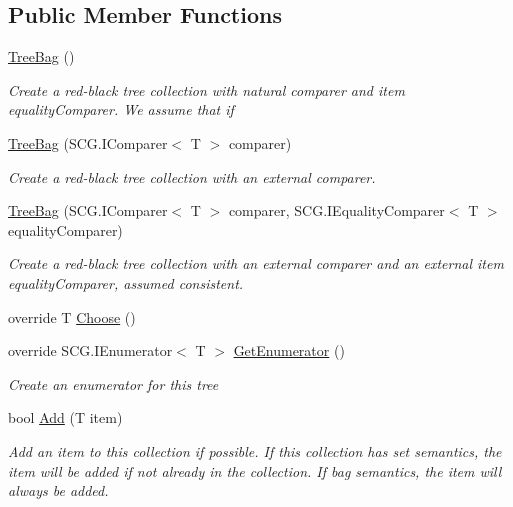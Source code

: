 \subsection*{Public Member Functions}
\begin{DoxyCompactItemize}
\item 
\hyperlink{class_c5_1_1_tree_bag_a5bde6ec5c04b5bdc82306b2fd8b436fd}{Tree\+Bag} ()
\begin{DoxyCompactList}\small\item\em Create a red-\/black tree collection with natural comparer and item equality\+Comparer. We assume that if \end{DoxyCompactList}\item 
\hyperlink{class_c5_1_1_tree_bag_aea3bce59511bfa8245f7662008cf43ac}{Tree\+Bag} (S\+C\+G.\+I\+Comparer$<$ T $>$ comparer)
\begin{DoxyCompactList}\small\item\em Create a red-\/black tree collection with an external comparer. \end{DoxyCompactList}\item 
\hyperlink{class_c5_1_1_tree_bag_a37084a09fe0911b3225e6b75aaac4eb6}{Tree\+Bag} (S\+C\+G.\+I\+Comparer$<$ T $>$ comparer, S\+C\+G.\+I\+Equality\+Comparer$<$ T $>$ equality\+Comparer)
\begin{DoxyCompactList}\small\item\em Create a red-\/black tree collection with an external comparer and an external item equality\+Comparer, assumed consistent. \end{DoxyCompactList}\item 
override T \hyperlink{class_c5_1_1_tree_bag_a7b05001428a9e4605f556683a9bea20a}{Choose} ()
\item 
override S\+C\+G.\+I\+Enumerator$<$ T $>$ \hyperlink{class_c5_1_1_tree_bag_a2c00797c0e29dd52efa05f219b4c9c7e}{Get\+Enumerator} ()
\begin{DoxyCompactList}\small\item\em Create an enumerator for this tree \end{DoxyCompactList}\item 
bool \hyperlink{class_c5_1_1_tree_bag_ac407a0824ba7e237c86525234b5b85bd}{Add} (T item)
\begin{DoxyCompactList}\small\item\em Add an item to this collection if possible. If this collection has set semantics, the item will be added if not already in the collection. If bag semantics, the item will always be added. \end{DoxyCompactList}\item 

\end{DoxyCompactItemize}
